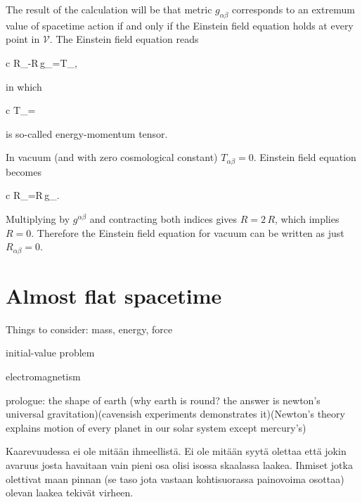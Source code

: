 \documentclass[11pt,oneside%
]{memoir}
\newenvironment{eqna}{\begin{IEEEeqnarray*}{c}}{\end{IEEEeqnarray*}\ignorespacesafterend}
\begin{document}
The result of the calculation will be that metric \(g_{\alpha\beta}\) corresponds to an extremum value of spacetime action if and only if the Einstein field equation holds at every point in \(\mathcal{V}\). The Einstein field equation reads
\begin{eqna}
R_{\alpha\beta}-R\,g_{\alpha\beta}=T_{\alpha\beta},%
\end{eqna}
in which
\begin{eqna}
T_{\alpha\beta}=
\end{eqna}
is so-called energy-momentum tensor.

In vacuum (and with zero cosmological constant) \(T_{\alpha\beta}=0\). Einstein field equation becomes
\begin{eqna}
R_{\alpha\beta}=R\,g_{\alpha\beta}.
\end{eqna}
Multiplying by \(g^{\alpha\beta}\) and contracting both indices gives \(R=2\,R\), which implies \(R=0\). Therefore the Einstein field equation for vacuum can be written as just \(R_{\alpha\beta}=0\).
















\chapter{Almost flat spacetime}

Things to consider: mass, energy, force

initial-value problem

electromagnetism

prologue: the shape of earth (why earth is round? the answer is newton's universal gravitation)(cavensish experiments demonstrates it)(Newton's theory explains motion of every planet in our solar system except mercury's)

\newpage
\tableofcontents

Kaarevuudessa ei ole mitään ihmeellistä. Ei ole mitään syytä olettaa että jokin avaruus josta havaitaan vain pieni osa olisi isossa skaalassa laakea. Ihmiset jotka olettivat maan pinnan (se taso jota vastaan kohtisuorassa painovoima osottaa) olevan laakea tekivät virheen.
\end{document}

